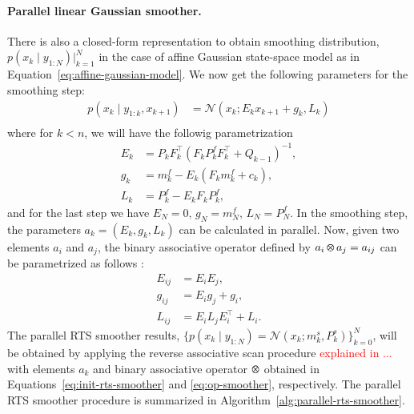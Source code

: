 \documentclass[dissertation,math,vertlayout,pdfa,colorlinks,nologo]{aaltoseries}
\DeclareMathOperator*{\Motimes}{\text{\raisebox{0.25ex}{\scalebox{0.65}{$\bigotimes$}}}}
\begin{document}
        \paragraph{\textbf{Parallel linear Gaussian smoother.}} There is also a closed-form representation to obtain smoothing distribution, $p(x_k \mid y_{1:N})|_{k = 1}^N$ in the case of affine Gaussian state-space model as in Equation~\eqref{eq:affine-gaussian-model}. We now get the following parameters for the smoothing step:
        \begin{equation}
            \begin{split}
                p(x_k \mid y_{1:k}, x_{k+1}) &= \mathcal{N}(x_k; E_k x_{k+1} + g_k, L_k)\\
            \end{split}
        \end{equation}
        where for $k<n$, we will have the followig parametrization
        \begin{equation} \label{eq:init-rts-smoother}
            \begin{split}
                E_k &= P_k F_k^\top  (F_k P^f_k F_k^\top + Q_{k-1} )^{-1}, \\
                g_k &= m^f_k - E_k (F_k m^f_k + c_k), \\
                L_k &= P^f_k - E_k F_k P^f_k,
            \end{split}
        \end{equation}
        and for the last step we have $E_N = 0,\, g_N = m^f_N, \, L_N = P^f_N$.
        In the smoothing step, the parameters $a_k = (E_k,g_k,L_k)$ can be calculated in parallel. Now, given two elements $a_i$ and $a_j$,  the binary associative operator defined by $a_i \Motimes a_j = a_{ij}$ can be parametrized  as follows \cite[lemma 10]{sarkka2020temporal}: 
        \begin{equation} \label{eq:op-smoother}
            \begin{split}
                E_{ij} &= E_i E_j,\\
                g_{ij} &= E_i g_j + g_i,\\
                L_{ij} &= E_i L_j E_i^\top + L_i.
            \end{split}
        \end{equation}
        The parallel RTS smoother results, $\big\{p(x_k \mid y_{1: N})  = \mathcal{N}(x_k; m^s_k, P^s_k)\big\}_{k = 0}^N$, will be obtained by applying the reverse associative scan procedure \textcolor{red}{explained in ...} with elements $a_k$ and binary associative operator $\Motimes$ obtained in Equations~\eqref{eq:init-rts-smoother} and \eqref{eq:op-smoother}, respectively. The parallel RTS smoother procedure is summarized in Algorithm~\ref{alg:parallel-rts-smoother}.
\end{document}
